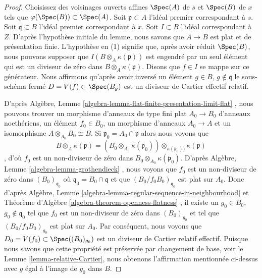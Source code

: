 \begin{proof}
Choisissez des voisinages ouverts affines  $\Spec(A)$  de  $s$  et
 $\Spec(B)$  de  $x$  tels que  $\varphi(\Spec(B)) \subset \Spec(A)$. Soit  $\mathfrak p \subset A$  l'idéal
premier correspondant à  $s$. Soit  $\mathfrak q \subset B$  l'idéal premier
correspondant à  $x$. Soit  $I \subset B$  l'idéal correspondant à
 $Z$. D'après l'hypothèse initiale du lemme, nous savons que  $A \to B$ 
est plat et de présentation finie. L'hypothèse en (1) signifie que, après avoir
réduit  $\Spec(B)$, nous pouvons supposer que  $I(B \otimes_A \kappa(\mathfrak p))$  est engendré par un
seul élément qui est un diviseur de zéro dans  $B \otimes_A \kappa(\mathfrak p)$. Disons que
 $f \in I$  se mappe sur ce générateur. Nous affirmons qu'après avoir inversé un
élément  $g \in B$,  $g \not \in \mathfrak q$  le sous-schéma fermé  $D = V(f) \subset \Spec(B_g)$  est un
diviseur de Cartier effectif relatif.

\medskip\noindent
D'après Algèbre, Lemme  \ref{algebra-lemma-flat-finite-presentation-limit-flat} , nous pouvons trouver un morphisme d'anneaux
de type fini plat  $A_0 \to B_0$  d'anneaux noethériens, un élément  $f_0 \in B_0$, un
morphisme d'anneaux  $A_0 \to A$  et un isomorphisme  $A \otimes_{A_0} B_0 \cong B$. Si  $\mathfrak p_0 = A_0 \cap \mathfrak p$ 
alors nous voyons que
$$
B \otimes_A \kappa(\mathfrak p) =
\left(B_0 \otimes_{A_0} \kappa(\mathfrak p_0)\right)
\otimes_{\kappa(\mathfrak p_0))} \kappa(\mathfrak p)
$$
, d'où  $f_0$  est un non-diviseur de zéro dans  $B_0 \otimes_{A_0} \kappa(\mathfrak p_0)$. D'après
Algèbre, Lemme  \ref{algebra-lemma-grothendieck} , nous voyons que  $f_0$  est un non-diviseur de
zéro dans  $(B_0)_{\mathfrak q_0}$  où  $\mathfrak q_0 = B_0 \cap \mathfrak q$  et que  $(B_0/f_0B_0)_{\mathfrak q_0}$  est plat sur
 $A_0$. Donc d'après Algèbre, Lemme  \ref{algebra-lemma-regular-sequence-in-neighbourhood}  et Théorème d'Algèbre
 \ref{algebra-theorem-openness-flatness} , il existe un  $g_0 \in B_0$,  $g_0 \not \in \mathfrak q_0$  tel que  $f_0$  est un
non-diviseur de zéro dans  $(B_0)_{g_0}$  et tel que  $(B_0/f_0B_0)_{g_0}$  est plat sur
 $A_0$. Par conséquent, nous voyons que  $D_0 = V(f_0) \subset \Spec((B_0)_{g_0})$  est un diviseur de
Cartier relatif effectif. Puisque nous savons que cette propriété est préservée
par changement de base, voir le Lemme  \ref{lemma-relative-Cartier}, nous obtenons l'affirmation
mentionnée ci-dessus avec  $g$  égal à l'image de  $g_0$  dans
 $B$.


\end{proof}
